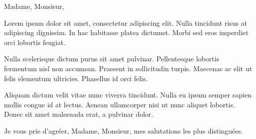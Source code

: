 \documentclass[a4paper,12pt]{letter}
\begin{document}



\subject{une demande un peu particulière}

Madame, Monsieur,

Lorem ipsum dolor sit amet, consectetur adipiscing elit. Nulla tincidunt risus
at adipiscing dignissim. In hac habitasse platea dictumst. Morbi sed eros
imperdiet orci lobortis feugiat.

Nulla scelerisque dictum purus sit amet pulvinar. Pellentesque lobortis
fermentum nisl non accumsan. Praesent in sollicitudin turpis. Maecenas ac elit
ut felis elementum ultricies. Phasellus id orci felis.

Aliquam dictum velit vitae nunc viverra tincidunt. Nulla eu ipsum
semper sapien mollis congue id at lectus. Aenean ullamcorper nisi ut nunc
aliquet lobortis. Donec sit amet malesuada erat, a pulvinar dolor.

Je vous prie d'agréer, Madame, Monsieur, mes salutations les plus distinguées.

\signature{John Doe}
\end{document}
